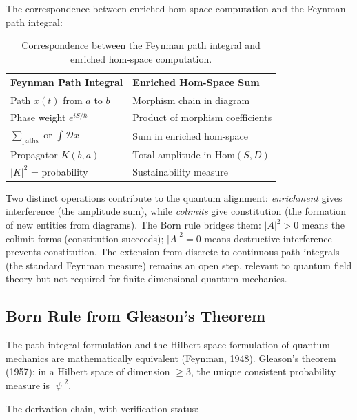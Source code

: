 \documentclass[12pt,a4paper]{article}
\begin{document}
The correspondence between enriched hom-space computation and the Feynman path integral:

\begin{table}[htbp]
\centering
\begin{tabular}{@{}ll@{}}
\toprule
Feynman Path Integral & Enriched Hom-Space Sum \\
\midrule
Path $x(t)$ from $a$ to $b$ & Morphism chain in diagram \\
Phase weight $e^{iS/\hbar}$ & Product of morphism coefficients \\
$\sum_{\text{paths}}$ or $\int \mathcal{D}x$ & Sum in enriched hom-space \\
Propagator $K(b,a)$ & Total amplitude in $\text{Hom}(S, D)$ \\
$|K|^2$ = probability & Sustainability measure \\
\bottomrule
\end{tabular}
\caption{Correspondence between the Feynman path integral and enriched hom-space computation.}
\label{tab:feynman-correspondence}
\end{table}

Two distinct operations contribute to the quantum alignment: \emph{enrichment} gives interference (the amplitude sum), while \emph{colimits} give constitution (the formation of new entities from diagrams). The Born rule bridges them: $|A|^2 > 0$ means the colimit forms (constitution succeeds); $|A|^2 = 0$ means destructive interference prevents constitution. The extension from discrete to continuous path integrals (the standard Feynman measure) remains an open step, relevant to quantum field theory but not required for finite-dimensional quantum mechanics.

\subsection{Born Rule from Gleason's Theorem}
\label{sec:born-rule}

The path integral formulation and the Hilbert space formulation of quantum mechanics are mathematically equivalent (Feynman, 1948). Gleason's theorem (1957): in a Hilbert space of dimension $\geq 3$, the unique consistent probability measure is $|\psi|^2$.

The derivation chain, with verification status:
\end{document}
